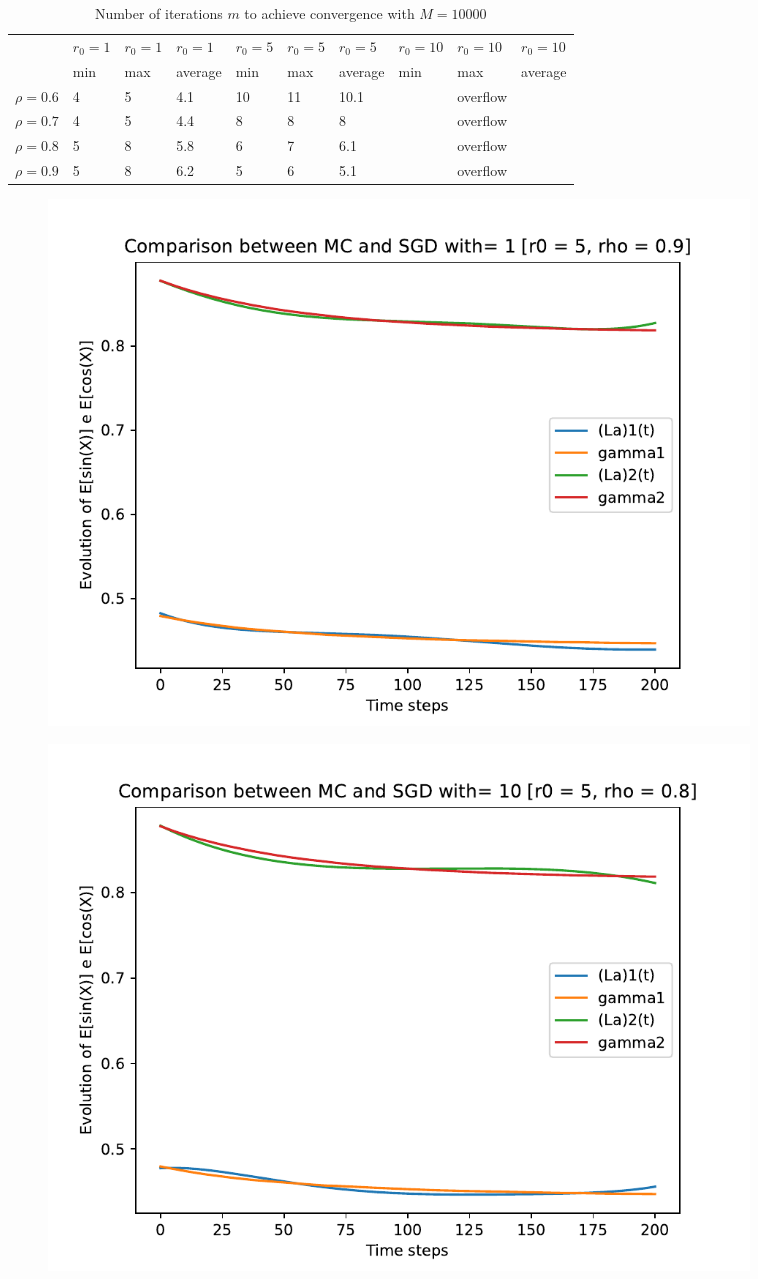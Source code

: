 \documentclass[a4paper,11pt,openright]{report}
\begin{document}
\begin{table}[H]
\centering
\addtolength{\leftskip}{-1.5cm}
\addtolength{\rightskip}{-1.5cm}
\begin{tabular}{|c|lllllllll|}
\hline
$ $ & $r_0 = 1$ & $r_0 = 1$ & $r_0 = 1$ & $r_0 = 5$ & $r_0 = 5$ & $r_0 = 5$ & $r_0 = 10$ & $r_0 = 10$ & $r_0 = 10$  \\
$ $ & min & max & average & min & max & average & min & max & average \\ 
\hline
$\rho = 0.6$ & 4 & 5 & 4.1 & 10 & 11 & 10.1 &  & overflow &  \\

$\rho = 0.7$ & 4 & 5 & 4.4 & 8 & 8 & 8 &  & overflow &  \\

$\rho = 0.8$ & 5 & 8 & 5.8 & 6 & 7 & 6.1 &  & overflow & \\

$\rho = 0.9$ & 5 & 8 & 6.2 & 5 & 6 & 5.1 &  & overflow & \\
\hline
\end{tabular}
\caption{Number of iterations $m$ to achieve convergence with $M = 10000$}
\end{table}
\begin{figure}[H]
\centering
\includegraphics[width=0.9\textwidth]{images/graphs T = 2/n = 5, M = 1 sine and cosine.pdf}
\end{figure}
\begin{figure}[H]
\centering
\includegraphics[width=0.9\textwidth]{images/graphs T = 2/n = 5, M = 10 sine and cosine.pdf}
\end{figure}
\end{document}
